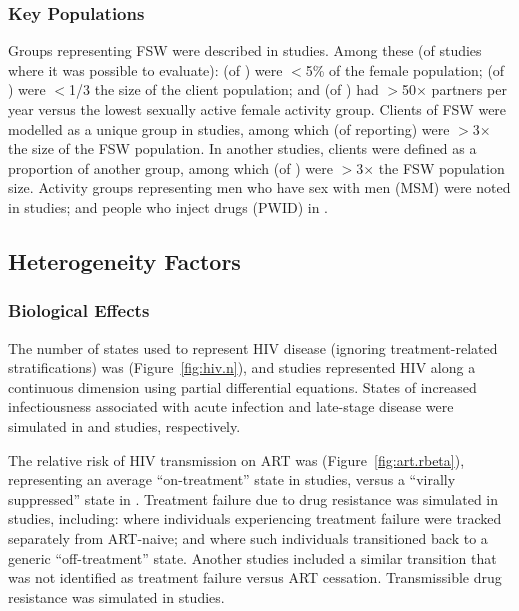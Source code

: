 \subsubsection{Key Populations}
\label{sss:res:kp}
Groups representing FSW were described in  studies.
Among these (of studies where it was possible to evaluate):
 (of ) were {$<$5\%} of the female population;
 (of ) were {$<$1/3} the size of the client population; and
 (of ) had {$>$50$\times$} partners per year versus
the lowest sexually active female activity group.
Clients of FSW were modelled as a unique group in  studies,
among which  (of  reporting)
were {$>$3$\times$} the size of the FSW population.
In another  studies, clients were defined as a proportion of another group,
among which  (of )
were {$>$3$\times$} the FSW population size.
Activity groups representing
men who have sex with men (MSM) were noted in  studies; and
people who inject drugs (PWID) in .
\subsection{Heterogeneity Factors}
\label{ss:res:factors}
\subsubsection{Biological Effects}
\label{sss:res:bio}
The \xdmdef number of states used to represent HIV disease
(ignoring treatment-related stratifications) was  (Figure~\ref{fig:hiv.n}),
and  studies represented HIV along a continuous dimension
using partial differential equations.
States of increased infectiousness associated with acute infection and late-stage disease
were simulated in  and  studies, respectively.
\par
The relative risk of HIV transmission on ART was 
(Figure~\ref{fig:art.rbeta}),
representing an average ``on-treatment'' state in  studies,
versus a ``virally suppressed'' state in .
Treatment failure due to drug resistance was simulated in  studies, including:
 where individuals experiencing treatment failure
were tracked separately from ART-naive; and
 where such individuals
transitioned back to a generic ``off-treatment'' state.
Another  studies included a similar transition
that was not identified as treatment failure versus ART cessation.
Transmissible drug resistance was simulated in  studies.
